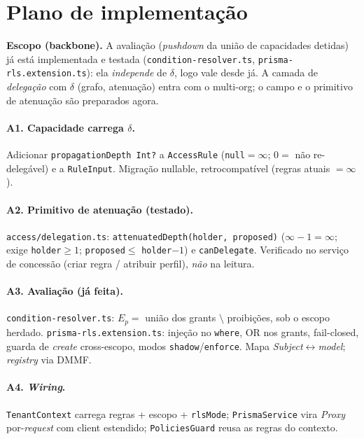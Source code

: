 \documentclass[11pt,a4paper]{article}
\theoremstyle{definition}
\newcommand{\dep}{\delta}
\begin{document}
  \appendix
  \section{Plano de implementação}\label{ap:plano}

  \textbf{Escopo (backbone).} A avaliação (\emph{pushdown} da união de
  capacidades detidas) já está implementada e testada
  (\texttt{condition-resolver.ts}, \texttt{prisma-rls.extension.ts}): ela
  \emph{independe} de $\dep$, logo vale desde já. A camada de \emph{delegação}
  com $\dep$ (grafo, atenuação) entra com o multi-org; o campo e o primitivo de
  atenuação são preparados agora.

  \paragraph{A1. Capacidade carrega $\dep$.}
  Adicionar \texttt{propagationDepth Int?} a \texttt{AccessRule}
  (\texttt{null}$=\infty$; $0=$ não re-delegável) e a \texttt{RuleInput}. Migração
  nullable, retrocompatível (regras atuais $=\infty$).

  \paragraph{A2. Primitivo de atenuação (testado).}
  \texttt{access/delegation.ts}: \texttt{attenuatedDepth(holder, proposed)}
  ($\infty-1=\infty$; exige \texttt{holder}$\ge1$; \texttt{proposed}$\le$
  \texttt{holder}$-1$) e \texttt{canDelegate}. Verificado no serviço de
  concessão (criar regra / atribuir perfil), \emph{não} na leitura.

  \paragraph{A3. Avaliação (já feita).}
  \texttt{condition-resolver.ts}: $E_p=$ união dos grants $\setminus$ proibições,
  sob o escopo herdado. \texttt{prisma-rls.extension.ts}: injeção no
  \texttt{where}, OR nos grants, fail-closed, guarda de \emph{create}
  cross-escopo, modos \texttt{shadow}/\texttt{enforce}. Mapa
  \emph{Subject}$\leftrightarrow$\emph{model}; \emph{registry} via DMMF.

  \paragraph{A4. \emph{Wiring}.}
  \texttt{TenantContext} carrega regras + escopo + \texttt{rlsMode};
  \texttt{PrismaService} vira \emph{Proxy} por-\emph{request} com client
  estendido; \texttt{PoliciesGuard} reusa as regras do contexto.
\end{document}
